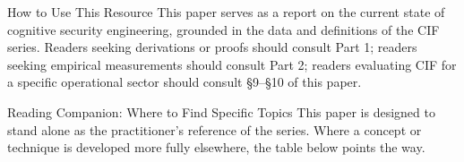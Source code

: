 \documentclass[
  ignorenonframetext,
]{beamer}
\begin{document}
\begin{frame}[allowframebreaks]{How to Use This Resource}
This paper serves as a report on the current state of cognitive security
engineering, grounded in the data and definitions of the CIF series.
Readers seeking derivations or proofs should consult Part 1; readers
seeking empirical measurements should consult Part 2; readers evaluating
CIF for a specific operational sector should consult §9--§10 of this
paper.
\end{frame}

\begin{frame}{Reading Companion: Where to Find
Specific Topics}
\protect{}\label{sec:reading-companion}
This paper is designed to stand alone as the practitioner's reference of
the series. Where a concept or technique is developed more fully
elsewhere, the table below points the way.

\end{frame}
\end{document}
